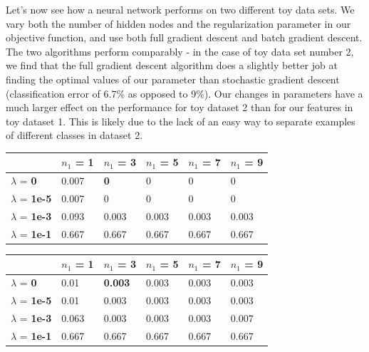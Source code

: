 \documentclass[10pt]{article}
\begin{document}
Let's now see how a neural network performs on two different toy data sets. We vary both the number of hidden nodes and the regularization parameter in our objective function, and use both full gradient descent and batch gradient descent. The two algorithms perform comparably - in the case of toy data set number 2, we find that the full gradient descent algorithm does a slightly better job at finding the optimal values of our parameter than stochastic gradient descent (classification error of 6.7\% as opposed to 9\%). Our changes in parameters have a much larger effect on the performance for toy dataset 2 than for our features in toy dataset 1. This is likely due to the lack of an easy way to separate examples of different classes in dataset 2.

\begin{table}
\centering
\begin{tabular}{llllll}
\toprule
& $n_1$ = \bf{1} & $n_1$ =  \bf{3} & $n_1$ =  \bf{5} & $n_1$ =  \bf{7} & $n_1$ =  \bf{9} \\
\midrule
$\lambda$ = \bf{0} &  0.007 & \bf{0}     & 0     & 0     & 0     \\
$\lambda$ = \bf{1e-5} & 0.007 & 0     & 0     & 0     & 0     \\
$\lambda$ = \bf{1e-3} & 0.093 & 0.003 & 0.003 & 0.003 & 0.003 \\
$\lambda$ = \bf{1e-1} & 0.667 & 0.667 & 0.667 & 0.667 & 0.667 \\
\bottomrule
\end{tabular}
\end{table}

\begin{table}
\centering
\begin{tabular}{llllll}
\toprule
& $n_1$ = \bf{1} & $n_1$ =  \bf{3} & $n_1$ =  \bf{5} & $n_1$ =  \bf{7} & $n_1$ =  \bf{9} \\
\midrule
$\lambda$ = \bf{0} &      0.01  & \bf{0.003} & 0.003 & 0.003 & 0.003 \\
$\lambda$ = \bf{1e-5} &  0.01  & 0.003 & 0.003 & 0.003 & 0.003 \\
$\lambda$ = \bf{1e-3} &  0.063 & 0.003 & 0.003 & 0.003 & 0.007 \\
$\lambda$ = \bf{1e-1} &  0.667 & 0.667 & 0.667 & 0.667 & 0.667 \\
\bottomrule
\end{tabular}
\end{table}
\end{document}
